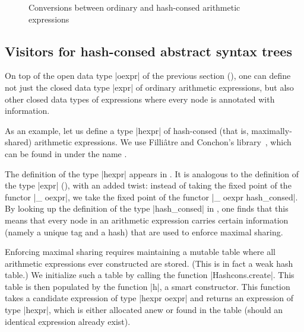 \documentclass[11pt,a4paper,twoside]{article}
\begin{document}
\begin{figure}[p]
\caption{Conversions between ordinary and hash-consed arithmetic expressions}
\label{fig:expr14}
\end{figure}

\subsection{Visitors for hash-consed abstract syntax trees}
\label{sec:advanced:hashconsed}

On top of the open data type \oc|oexpr| of the previous section
(), one can define not just the closed data type
\oc|expr| of ordinary arithmetic expressions, but also other closed data types
of expressions where every node is annotated with information.

As an example, let us define a type \oc|hexpr| of hash-consed (that is,
maximally-shared) arithmetic expressions. We use Filliâtre and Conchon's
library~\cite{filliatre-conchon-06}, which can be found in \opam under the
name \hashcons.

The definition of the type \oc|hexpr| appears in . It is
analogous to the definition of the type \oc|expr| (), with an
added twist: instead of taking the fixed point of the functor \oc|_ oexpr|, we
take the fixed point of the functor \oc|_ oexpr hash_consed|. By looking up
the definition of the type \oc|hash_consed| in ,
one finds that this means that every node in an arithmetic expression carries
certain information (namely a unique tag and a hash) that are used to enforce
maximal sharing.

Enforcing maximal sharing requires maintaining a mutable table where all
arithmetic expressions ever constructed are stored. (This is in fact a weak
hash table.) We initialize such a table by calling the function
\oc|Hashcons.create|. This table is then populated by the function \oc|h|, a smart
constructor.
This function takes a candidate expression of type \oc|hexpr oexpr| and
returns an expression of type \oc|hexpr|, which is either allocated anew
or found in the table (should an identical expression already exist).
\end{document}
